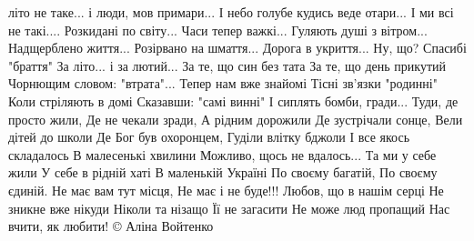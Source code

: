  
 
 
 
 

 літо не таке...
 і люди, мов примари...
І небо голубе кудись веде отари...
І ми всі не такі....
Розкидані по світу...
Часи тепер важкі...
Гуляють душі з вітром...
Надщерблено життя...
Розірвано на шмаття...
Дорога в укриття...
Ну, що? Спасибі "браття"
За літо... і за лютий...
За те, що син без тата
За те, що день прикутий 
Чорнющим словом: "втрата"...
Тепер нам вже знайомі
Тісні зв'язки "родинні"
Коли стріляють в домі
Сказавши: "самі винні"
І сиплять бомби, гради...
Туди, де просто жили,
Де не чекали зради,
А рідним дорожили
Де зустрічали сонце,
Вели дітей до школи
Де Бог був охоронцем, 
Гуділи влітку бджоли
І все якось складалось
В малесенькі хвилини
Можливо, щось не вдалось...
Та ми у себе жили
У себе в рідній хаті 
В маленькій Україні
По своєму багатій,
По своєму єдиній.
Не має вам тут місця,
Не має і не буде!!!
Любов, що в нашім серці 
Не зникне вже нікуди
Ніколи та нізащо
Її не загасити
Не може люд пропащий 
Нас вчити, як любити!
                      ©️ Аліна Войтенко

